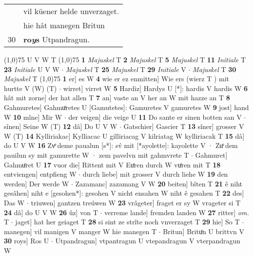 \documentclass[8pt,a4paper,notitlepage]{article}
\begin{document}
\begin{table}[ht]
\begin{minipage}[t]{0.5\linewidth}
\begin{tabular}{rl}
 & vil küener helde unverzaget.\\ 
 & hie hât manegen Britun\\ 
30 & \textbf{ro\textit{y}s} Utpandragun.\\ 
\end{tabular}
\scriptsize
\line(1,0){75} \newline
U V W T \newline
\line(1,0){75} \newline
\textbf{1} \textit{Majuskel} T  \textbf{2} \textit{Majuskel} T  \textbf{5} \textit{Majuskel} T  \textbf{11} \textit{Initiale} T  \textbf{23} \textit{Initiale} U V W   $\cdot$ \textit{Majuskel} T  \textbf{25} \textit{Majuskel} T  \textbf{29} \textit{Initiale} V   $\cdot$ \textit{Majuskel} T  \textbf{30} \textit{Majuskel} T  \newline
\line(1,0){75} \newline
\textbf{1} er] es W \textbf{4} wie er ez enmitten] Wie ers (wierz T ) mit hurtte V (W) (T)  $\cdot$ wirret] virret W \textbf{5} Hardiz] Hardys U [*]: hardis V hardis W \textbf{6} hât mit zorne] der hat allen T \textbf{7} an] vaste an V her an W mit hazze an T \textbf{8} Gahmuretes] Gahmuͦretes U [Gamutetes]: Gamuretes V gamuretes W \textbf{9} jost] hand W \textbf{10} mîne] Mir W  $\cdot$ der veigen] die veige U \textbf{11} Do sante er sinen botten san V  $\cdot$ sînen] Seine W (T) \textbf{12} dâ] Do U V W  $\cdot$ Gatschier] Gascier T \textbf{13} sîner] grosser V W (T) \textbf{14} Kylliriakac] Kylliacac U gilliriacag V kilriatag W kylliriacak T \textbf{15} dâ] do U V W \textbf{16} Zvͦ deme paualun [s*]: sv́ mit [*ayolette]: kayolette V · Zuͦ dem pauilun sy mit gamurette W · zem pavelvn mit gahmvrete T  $\cdot$ Gahmuret] Gahmuͦret U \textbf{17} vuor die] Rittent mit V Euͦren durch W vuͦren mit T \textbf{18} entviengen] entpfieng W  $\cdot$ durch liebe] mit grosser V durch liehe W \textbf{19} den werden] Der werde W  $\cdot$ Zazamanc] zazamang V W \textbf{20} beiten] bîten T \textbf{21} ê niht gesâhen] niht e [gesohen*]: gesohen V nicht ensahen W niht ê gesahen T \textbf{22} des] Das W  $\cdot$ triuwen] gantzen treúwen W \textbf{23} vrâgeter] fraget er sy W vrageter si T \textbf{24} dâ] do U V W \textbf{26} ûz] von T  $\cdot$ verreme lande] fremden landen W \textbf{27} ritter] \textit{om.} T  $\cdot$ jaget] hat her geiaget T \textbf{28} si sint ze strîte noch vnverzaget T \textbf{29} hie] So T  $\cdot$ manegen] vil manigen V manger W hie manegen T  $\cdot$ Britun] Brituͦn U brittvn V \textbf{30} roys] Ros U  $\cdot$ Utpandragun] vtpantragun U vtepandragun V vterpandragun W \newline
\end{minipage}
\end{table}
\end{document}

